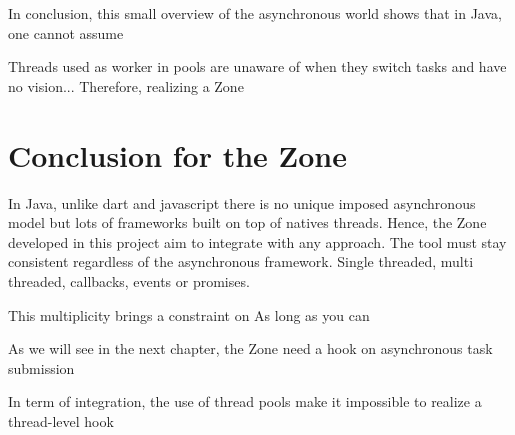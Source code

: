 \section*{}
In conclusion, this small overview of the asynchronous world shows that in Java, one cannot assume

Threads used as worker in pools are unaware of when they switch tasks and have no vision...
Therefore, realizing a Zone 


\section*{Conclusion for the Zone} %
In Java, unlike dart and javascript there is no unique imposed asynchronous model but lots of frameworks built on top of natives threads.
Hence, the Zone developed in this project aim to integrate with any approach. The tool must stay consistent regardless of the asynchronous framework. Single threaded, multi threaded, callbacks, events or promises.

This multiplicity brings a constraint on
As long as you can 

As we will see in the next chapter, the Zone need a hook on asynchronous task submission

In term of integration, the use of thread pools make it impossible to realize a thread-level hook